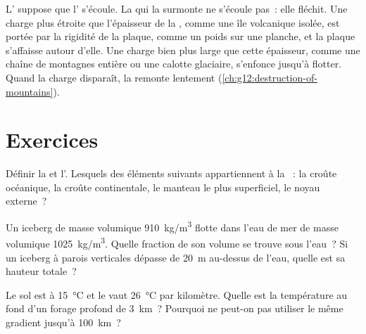 L' suppose que l' s'écoule. La  qui la
surmonte ne s'écoule pas~: elle fléchit. Une charge plus étroite que
l'épaisseur de la , comme une île volcanique isolée, est portée
par la rigidité de la plaque, comme un poids sur une planche, et la plaque
s'affaisse autour d'elle. Une charge bien plus large que cette épaisseur,
comme une chaîne de montagnes entière ou une calotte glaciaire, s'enfonce
jusqu'à flotter. Quand la charge disparaît, la  remonte
lentement (\cref{ch:g12:destruction-of-mountains}).

\section{Exercices}

\begin{exercise}[$\star$]\label{exo:g11:lithosphere-asthenosphere:1}
Définir la  et l'. Lesquels des éléments suivants
appartiennent à la ~: la croûte océanique, la croûte
continentale, le manteau le plus superficiel, le noyau externe~?
\end{exercise}

\begin{exercise}[$\star$]\label{exo:g11:lithosphere-asthenosphere:2}
Un iceberg de masse volumique \qty{910}{kg/m^3} flotte dans l'eau de mer de
masse volumique \qty{1025}{kg/m^3}. Quelle fraction de son volume se trouve
sous l'eau~? Si un iceberg à parois verticales dépasse de \qty{20}{m}
au-dessus de l'eau, quelle est sa hauteur totale~?
\end{exercise}

\begin{exercise}[$\star$]\label{exo:g11:lithosphere-asthenosphere:3}
Le sol est à \qty{15}{\celsius} et le  vaut
\qty{26}{\celsius} par kilomètre. Quelle est la température au fond d'un
forage profond de \qty{3}{km}~? Pourquoi ne peut-on pas utiliser le même
gradient jusqu'à \qty{100}{km}~?
\end{exercise}

